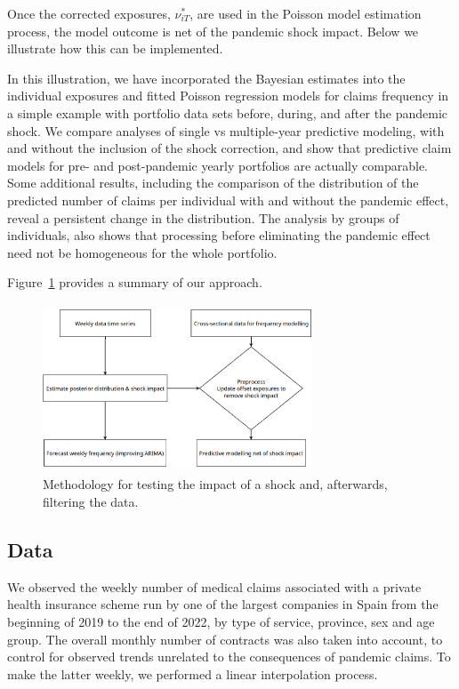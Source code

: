 \documentclass[]{risa}
\begin{document}
Once the corrected exposures, $\nu^*_{iT}$, are used in the Poisson model estimation process, the model outcome is net of the pandemic shock impact. Below we illustrate how this can be implemented.

In this illustration, we have incorporated the Bayesian estimates into the individual exposures and fitted Poisson regression models for claims frequency in a simple example with portfolio data sets before, during, and after the pandemic shock. We compare analyses of single vs multiple-year predictive modeling, with and without the inclusion of the shock correction, and show that predictive claim models for pre- and post-pandemic yearly portfolios are actually comparable. Some additional results, including the comparison of the distribution of the predicted number of claims per individual with and without the pandemic effect, reveal a persistent change in the distribution. The analysis by groups of individuals, also shows that processing before eliminating the pandemic effect need not be homogeneous for the whole portfolio.

Figure~\ref{fig1} provides a summary of our approach.
\begin{center}
  \begin{figure}[ht]
    \includegraphics[width=8cm, height=5cm]{Diagrama1.png}\caption{Methodology for testing the impact of a shock and, afterwards, filtering the data.}\label{fig1}
  \end{figure}
	\end{center}
	

\subsection{Data}\label{data}
We observed the weekly number of medical claims associated with a private health insurance scheme run by one of the largest companies in Spain from the beginning of 2019 to the end of 2022, by type of service, province, sex and age group. The overall monthly number of contracts was also taken into account, to control for observed trends unrelated to the consequences of pandemic claims. To make the latter weekly, we performed a linear interpolation process.
\end{document}
